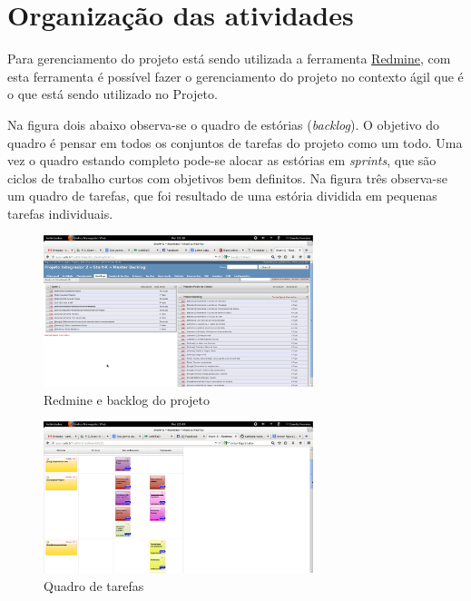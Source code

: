 \chapter[Organização das atividades]{Organização das atividades}
Para gerenciamento do projeto está sendo utilizada a ferramenta \href{http://lappis.unb.br/redm}{Redmine}, com esta ferramenta é possível fazer o gerenciamento do projeto no contexto ágil que é o que está sendo utilizado no Projeto.

Na figura dois abaixo observa-se o quadro de estórias (\textit{backlog}). O objetivo do quadro é pensar em todos os conjuntos de tarefas do projeto como um todo. Uma vez o quadro estando completo pode-se alocar as estórias em \textit{sprints}, que são ciclos de trabalho curtos com objetivos bem definitos. Na figura três observa-se um quadro de tarefas, que foi resultado de uma estória dividida em pequenas tarefas individuais.

\begin{figure}[h]
  \centering
  \includegraphics[width=0.7\textwidth]
      {figuras/backlogs.eps}
  \caption{Redmine e backlog do projeto}
  \label{redmine-backlog}
\end{figure}

\begin{figure}[h]
  \centering
  \includegraphics[width=0.7\textwidth]
      {figuras/quadrotarefas.eps}
  \caption{Quadro de tarefas}
  \label{quadro-de-tarefas}
\end{figure}
\newpage


